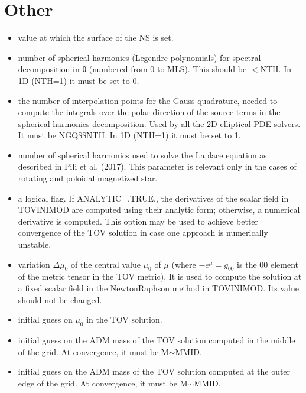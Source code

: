 \documentclass[letterpaper,10pt,english]{sphinxmanual}
\begin{document}
\section{Other}
\label{\detokenize{user_params:other}}\begin{itemize}
\item {} 
\sphinxAtStartPar
{} \sphinxhyphen{} value at which the surface of the NS is set.


\item {} 
\sphinxAtStartPar
{} \sphinxhyphen{} number of spherical harmonics (Legendre polynomials) for spectral decomposition in θ (numbered from 0 to MLS). This should be \(< \)NTH. In 1D (NTH=1) it must be set to 0.


\item {} 
\sphinxAtStartPar
{} \sphinxhyphen{} the number of interpolation points for the Gauss quadrature, needed to compute the integrals
over the polar direction of the source terms in the spherical harmonics decomposition. Used by all the
2D elliptical PDE solvers. It must be NGQ\$\$NTH. In 1D (NTH=1) it must be set to 1.


\item {} 
\sphinxAtStartPar
{} \sphinxhyphen{} number of spherical harmonics used to solve the Laplace equation as described in Pili et al.
(2017). This parameter is relevant only in the cases of rotating and poloidal magnetized star.


\item {} 
\sphinxAtStartPar
{} \sphinxhyphen{} a logical flag. If ANALYTIC=.TRUE., the derivatives of the scalar field in TOVINIMOD are computed using their analytic form; otherwise, a numerical derivative is computed. This option may be used to achieve better convergence of the TOV solution in case one approach is numerically unstable.


\item {} 
\sphinxAtStartPar
{} \sphinxhyphen{} variation \(\Delta \mu _0\) of the central value \(\mu _0\) of \(\mu\) (where \(-e^\mu = g _{00}\) is the \(00\) element of the metric tensor in the TOV metric). It is used to compute the solution at a fixed scalar field in the Newton\sphinxhyphen{}Raphson method in TOVINIMOD. Its value should not be changed.


\item {} 
\sphinxAtStartPar
{} \sphinxhyphen{} initial guess on \(\mu _0\) in the TOV solution.


\item {} 
\sphinxAtStartPar
{} \sphinxhyphen{} initial guess on the ADM mass of the TOV solution computed in the middle of the grid. At convergence, it must be M\(\sim\)MMID.


\item {} 
\sphinxAtStartPar
{} \sphinxhyphen{} initial guess on the ADM mass of the TOV solution computed at the outer edge of the grid. At convergence, it must be M\(\sim\)MMID.

\end{itemize}
\end{document}
